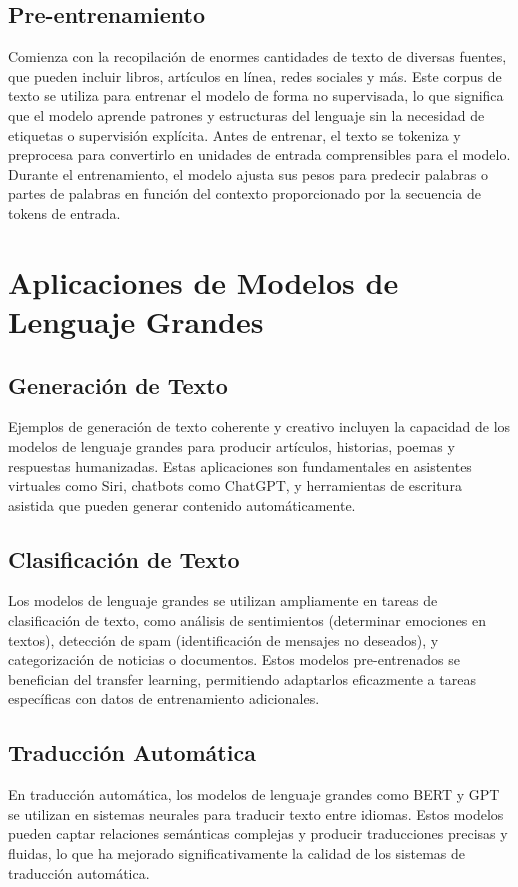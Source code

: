 \subsection{Pre-entrenamiento}
 Comienza con la recopilación de enormes cantidades de texto de diversas fuentes, que pueden incluir libros, artículos en línea, redes sociales y más. Este corpus de texto se utiliza para entrenar el modelo de forma no supervisada, lo que significa que el modelo aprende patrones y estructuras del lenguaje sin la necesidad de etiquetas o supervisión explícita. Antes de entrenar, el texto se tokeniza y preprocesa para convertirlo en unidades de entrada comprensibles para el modelo. Durante el entrenamiento, el modelo ajusta sus pesos para predecir palabras o partes de palabras en función del contexto proporcionado por la secuencia de tokens de entrada.




\section{Aplicaciones de Modelos de Lenguaje Grandes}
\subsection{Generación de Texto}
Ejemplos de generación de texto coherente y creativo incluyen la capacidad de los modelos de lenguaje grandes para producir artículos, historias, poemas y respuestas humanizadas. Estas aplicaciones son fundamentales en asistentes virtuales como Siri, chatbots como ChatGPT, y herramientas de escritura asistida que pueden generar contenido automáticamente.

\subsection{Clasificación de Texto}
Los modelos de lenguaje grandes se utilizan ampliamente en tareas de clasificación de texto, como análisis de sentimientos (determinar emociones en textos), detección de spam (identificación de mensajes no deseados), y categorización de noticias o documentos. Estos modelos pre-entrenados se benefician del transfer learning, permitiendo adaptarlos eficazmente a tareas específicas con datos de entrenamiento adicionales.

\subsection{Traducción Automática}
En traducción automática, los modelos de lenguaje grandes como BERT y GPT se utilizan en sistemas neurales para traducir texto entre idiomas. Estos modelos pueden captar relaciones semánticas complejas y producir traducciones precisas y fluidas, lo que ha mejorado significativamente la calidad de los sistemas de traducción automática.

